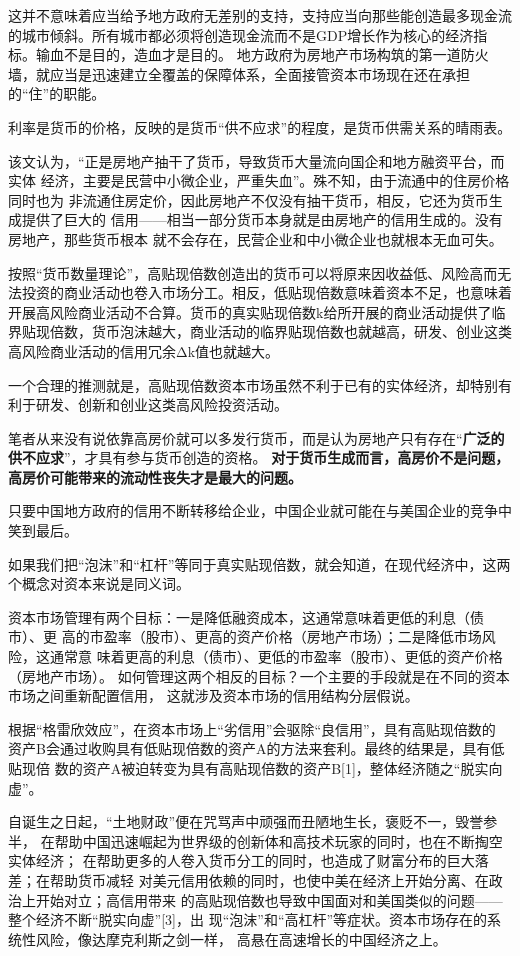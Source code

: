 这并不意味着应当给予地方政府无差别的支持，支持应当向那些能创造最多现金流的城市倾斜。所有城市都必须将创造现金流而不是GDP增长作为核心的经济指标。输血不是目的，造血才是目的。
地方政府为房地产市场构筑的第一道防火墙，就应当是迅速建立全覆盖的保障体系，全面接管资本市场现在还在承担的“住”的职能。

利率是货币的价格，反映的是货币“供不应求”的程度，是货币供需关系的晴雨表。

该文认为，“正是房地产抽干了货币，导致货币大量流向国企和地方融资平台，而实体
经济，主要是民营中小微企业，严重失血”。殊不知，由于流通中的住房价格同时也为
非流通住房定价，因此房地产不仅没有抽干货币，相反，它还为货币生成提供了巨大的
信用——相当一部分货币本身就是由房地产的信用生成的。没有房地产，那些货币根本
就不会存在，民营企业和中小微企业也就根本无血可失。

按照“货币数量理论”，高贴现倍数创造出的货币可以将原来因收益低、风险高而无法投资的商业活动也卷入市场分工。相反，低贴现倍数意味着资本不足，也意味着开展高风险商业活动不合算。货币的真实贴现倍数k给所开展的商业活动提供了临界贴现倍数，货币泡沫越大，商业活动的临界贴现倍数也就越高，研发、创业这类高风险商业活动的信用冗余Δk值也就越大。

一个合理的推测就是，高贴现倍数资本市场虽然不利于已有的实体经济，却特别有利于研发、创新和创业这类高风险投资活动。

笔者从来没有说依靠高房价就可以多发行货币，而是认为房地产只有存在“\textbf{广泛的供不应求}”，才具有参与货币创造的资格。
\textbf{对于货币生成而言，高房价不是问题，高房价可能带来的流动性丧失才是最大的问题。}

只要中国地方政府的信用不断转移给企业，中国企业就可能在与美国企业的竞争中笑到最后。

如果我们把“泡沫”和“杠杆”等同于真实贴现倍数，就会知道，在现代经济中，这两个概念对资本来说是同义词。

资本市场管理有两个目标：一是降低融资成本，这通常意味着更低的利息（债市）、更
高的市盈率（股市）、更高的资产价格（房地产市场）；二是降低市场风险，这通常意
味着更高的利息（债市）、更低的市盈率（股市）、更低的资产价格（房地产市场）。
如何管理这两个相反的目标？一个主要的手段就是在不同的资本市场之间重新配置信用，
这就涉及资本市场的信用结构分层假说。

根据“格雷欣效应”，在资本市场上“劣信用”会驱除“良信用”，具有高贴现倍数的
资产B会通过收购具有低贴现倍数的资产A的方法来套利。最终的结果是，具有低贴现倍
数的资产A被迫转变为具有高贴现倍数的资产B[1]，整体经济随之“脱实向虚”。

自诞生之日起，“土地财政”便在咒骂声中顽强而丑陋地生长，褒贬不一，毁誉参半，
在帮助中国迅速崛起为世界级的创新体和高技术玩家的同时，也在不断掏空实体经济；
在帮助更多的人卷入货币分工的同时，也造成了财富分布的巨大落差；在帮助货币减轻
对美元信用依赖的同时，也使中美在经济上开始分离、在政治上开始对立；高信用带来
的高贴现倍数也导致中国面对和美国类似的问题——整个经济不断“脱实向虚”[3]，出
现“泡沫”和“高杠杆”等症状。资本市场存在的系统性风险，像达摩克利斯之剑一样，
高悬在高速增长的中国经济之上。

